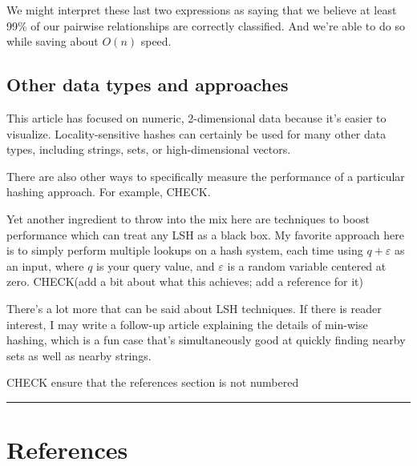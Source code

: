 \documentclass[20pt,]{extarticle}
\begin{document}
We might interpret these last two expressions as saying that we believe
at least 99\% of our pairwise relationships are correctly classified.
And we're able to do so while saving about \(O(n)\) speed.

\subsection{Other data types and
approaches}\label{other-data-types-and-approaches}

This article has focused on numeric, 2-dimensional data because it's
easier to visualize. Locality-sensitive hashes can certainly be used for
many other data types, including strings, sets, or high-dimensional
vectors.

There are also other ways to specifically measure the performance of a
particular hashing approach. For example, CHECK.

Yet another ingredient to throw into the mix here are techniques to
boost performance which can treat any LSH as a black box. My favorite
approach here is to simply perform multiple lookups on a hash system,
each time using \(q + \varepsilon\) as an input, where \(q\) is your
query value, and \(\varepsilon\) is a random variable centered at zero.
CHECK(add a bit about what this achieves; add a reference for it)

There's a lot more that can be said about LSH techniques. If there is
reader interest, I may write a follow-up article explaining the details
of min-wise hashing, which is a fun case that's simultaneously good at
quickly finding nearby sets as well as nearby strings.

CHECK ensure that the references section is not numbered

\begin{center}\rule{0.5\linewidth}{\linethickness}\end{center}

\section{References}\label{references}
\end{document}
